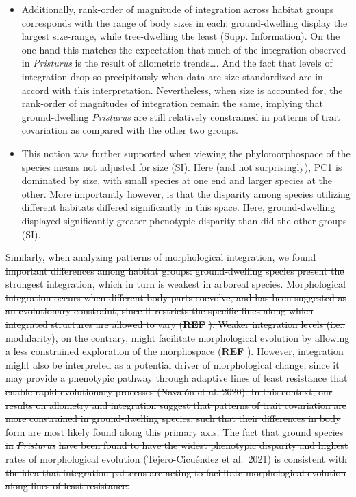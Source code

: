 \documentclass[
  11pt,
]{article}
\providecommand{\tightlist}{%
  \setlength{\itemsep}{0pt}\setlength{\parskip}{0pt}}
\providecommand{\DIFdeltex}[1]{{\protect\color{red}\sout{#1}}}                      %
\providecommand{\DIFdelbegin}{} %
\providecommand{\DIFdel}[1]{\texorpdfstring{\DIFdeltex{#1}}{}} %
\newcommand{\DIFscaledelfig}{0.5}
\newlength{\DIFdelgraphicswidth} %
\newlength{\DIFdelgraphicsheight} %
\newcommand{\DIFdelincludegraphics}[2][]{%
\sbox{\DIFdelgraphicsbox}{\DIFOincludegraphics[#1]{#2}}%
\settoboxwidth{\DIFdelgraphicswidth}{\DIFdelgraphicsbox} %
\settoboxtotalheight{\DIFdelgraphicsheight}{\DIFdelgraphicsbox} %
\scalebox{\DIFscaledelfig}{%
\parbox[b]{\DIFdelgraphicswidth}{\usebox{\DIFdelgraphicsbox}\\[-\baselineskip] \rule{\DIFdelgraphicswidth}{0em}}\llap{\resizebox{\DIFdelgraphicswidth}{\DIFdelgraphicsheight}{%
\setlength{\unitlength}{\DIFdelgraphicswidth}%
\begin{picture}(1,1)%
\thicklines\linethickness{2pt} %
{\color[rgb]{1,0,0}\put(0,0){\framebox(1,1){}}}%
{\color[rgb]{1,0,0}\put(0,0){\line( 1,1){1}}}%
{\color[rgb]{1,0,0}\put(0,1){\line(1,-1){1}}}%
\end{picture}%
}\hspace*{3pt}}} %
} %
\DeclareRobustCommand{\DIFdelbegin}{\DIFOdelbegin \let\includegraphics\DIFdelincludegraphics} %
\begin{document}
\begin{itemize}
  \begin{itemize}
  \tightlist
  \item
    Additionally, rank-order of magnitude of integration across habitat
    groups corresponds with the range of body sizes in each:
    ground-dwelling display the largest size-range, while tree-dwelling
    the least (Supp. Information). On the one hand this matches the
    expectation that much of the integration observed in
    \emph{Pristurus} is the result of allometric trends\ldots. And the
    fact that levels of integration drop so precipitously when data are
    size-standardized are in accord with this interpretation.
    Nevertheless, when size is accounted for, the rank-order of
    magnitudes of integration remain the same, implying that
    ground-dwelling \emph{Pristurus} are still relatively constrained in
    patterns of trait covariation as compared with the other two
    groups.\\
  \item
    This notion was further supported when viewing the phylomorphospace
    of the species means not adjusted for size (SI). Here (and not
    surprisingly), PC1 is dominated by size, with small species at one
    end and larger species at the other. More importantly however, is
    that the disparity among species utilizing different habitats
    differed significantly in this space. Here, ground-dwelling
    displayed significantly greater phenotypic disparity than did the
    other groups (SI).
  \end{itemize}
\DIFdelbegin %

\DIFdel{Similarly, when analyzing patterns of morphological integration, we
found important differences among habitat groups: ground-dwelling
species present the strongest integration, which in turn is weakest in
arboreal species. Morphological integration occurs when different body
parts coevolve, and has been suggested as an evolutionary constraint,
since it restricts the specific lines along which integrated structures
are allowed to vary (}\textbf{\DIFdel{REF}}%
\DIFdel{). Weaker integration levels (i.e.,
modularity), on the contrary, might facilitate morphological evolution
by allowing a less constrained exploration of the morphospace
(}\textbf{\DIFdel{REF}}%
\DIFdel{). However, integration might also be interpreted as a
potential driver of morphological change, since it may provide a
phenotypic pathway through adaptive lines of least resistance that
enable rapid evolutionary processes (Navalón et al. 2020). In this
context, our results on allometry and integration suggest that patterns
of trait covariation are more constrained in ground-dwelling species,
such that their differences in body form are most likely found along
this primary axis. The fact that ground species in }\emph{\DIFdel{Pristurus}} %
\DIFdel{have
been found to have the widest phenotypic disparity and highest rates of
morphological evolution (Tejero-Cicuéndez et al.~2021) is consistent
with the idea that integration patterns are acting to facilitate
morphological evolution along lines of least resistance.
}%


\end{itemize}
\end{document}
